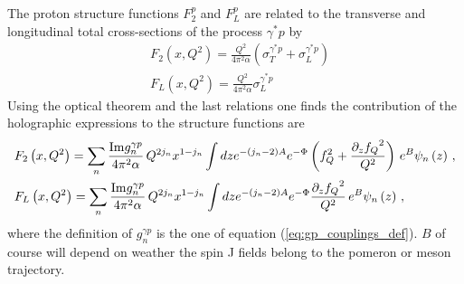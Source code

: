 \documentclass[a4paper,12pt]{article}
\begin{document}
The proton structure functions $F^p_2$ and $F^p_L$ are related to the transverse and longitudinal total cross-sections of the process $\gamma^{*} p$ by
\begin{align}
&F_2\left(x, Q^2\right) = \frac{Q^2}{4 \pi^2 \alpha} \left(\sigma_T^{\gamma^* p} + \sigma_L^{\gamma^* p} \right) \\
&F_L\left(x, Q^2\right) = \frac{Q^2}{4 \pi^2 \alpha} \sigma_L^{\gamma^* p} 
\end{align}
Using the optical theorem and the last relations one finds the contribution of the holographic expressions to the structure functions are
\begin{align}
&F_2\left(x, Q^2\right) = \sum_n \frac{{\rm Im} g^{\gamma p}_n}{4 \pi^2 \alpha} \, Q^{2 j_n} x^{1-j_n}  \int dz e^{-\left(j_n - 2 \right)A } e^{-\Phi}  \left(f_Q^2 +\frac{\partial_z{f_Q}^2}{Q^2} \right) \, e^B \psi_n\left(z\right) \, \label{eq:hol_f2} , \\
&F_L\left(x, Q^2\right) = \sum_n \frac{{\rm Im} g^{\gamma p}_n}{4 \pi^2 \alpha} \, Q^{2 j_n} x^{1-j_n}  \int dz e^{-\left(j_n - 2 \right)A } e^{-\Phi} \frac{\partial_z{f_Q}^2}{Q^2} \, e^B \psi_n\left(z\right) \, \label{eq:hol_fl} ,
\end{align}
where the definition of $g^{\gamma p}_n$ is the one of equation (\ref{eq:gp_couplings_def}). $B$ of course will depend on weather the spin J fields belong to the pomeron or meson trajectory.
\end{document}
